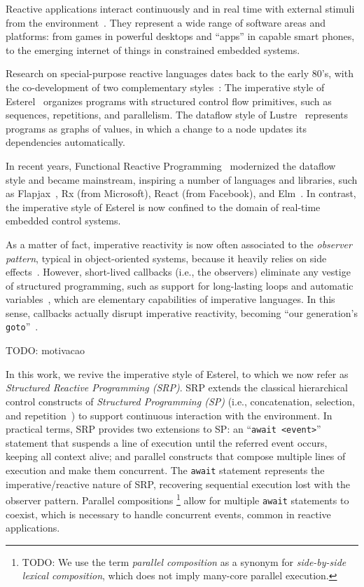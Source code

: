 \documentclass{acm_proc_article-sp}
\newcommand{\code}[1] {{\small{\texttt{#1}}}}
\newcommand{\1}{\;}
\newcommand{\2}{\;\;}
\newcommand{\3}{\;\;\;}
\newcommand{\5}{\;\;\;\;\;}
\begin{document}
Reactive applications interact continuously and in real time with external 
stimuli from the environment~\cite{statecharts.reactive,rp.synchronous}.
They represent a wide range of software areas and platforms: from games in 
powerful desktops and ``apps'' in capable smart phones, to the emerging 
internet of things in constrained embedded systems.

Research on special-purpose reactive languages dates back to the early 80's, 
with the co-development of two complementary 
styles~\cite{rp.twelve,rp.hypothesis}:
%
The imperative style of Esterel~\cite{esterel.ieee91} organizes programs with 
structured control flow primitives, such as sequences, repetitions, and 
parallelism.
%
The dataflow style of Lustre~\cite{lustre.ieee91} represents programs as graphs 
of values, in which a change to a node updates its dependencies automatically.

In recent years, Functional Reactive Programming~\cite{frp.principles} 
modernized the dataflow style and became mainstream, inspiring a number of 
languages and libraries, such as Flapjax~\cite{frp.flapjax}, Rx (from 
Microsoft), React (from Facebook), and Elm~\cite{frp.elm}.
%
In contrast, the imperative style of Esterel is now confined to the domain of 
real-time embedded control systems.

As a matter of fact, imperative reactivity is now often associated to the 
\emph{observer pattern}, typical in object-oriented systems, because it heavily 
relies on side effects~\cite{rp.deprecating,rp.rescala}.
%
However, short-lived callbacks (i.e., the observers) eliminate any vestige of 
structured programming, such as support for long-lasting loops and automatic 
variables~\cite{sync_async.cooperative}, which are elementary capabilities of 
imperative languages.
%
In this sense, callbacks actually disrupt imperative reactivity, becoming ``our 
generation's \code{goto}''~\cite{rp.goto,elm.goto}.

TODO: motivacao

In this work, we revive the imperative style of Esterel, to which we now refer 
as \emph{Structured Reactive Programming (SRP)}.
%
SRP extends the classical hierarchical control constructs of \emph{Structured 
Programming (SP)} (i.e., concatenation, selection, and 
repetition~\cite{dij.notes}) to support continuous interaction with the 
environment.
%
In practical terms, SRP provides two extensions to SP:
an ``\code{await <event>}'' statement that suspends a line of execution until 
the referred event occurs, keeping all context alive;
and parallel constructs that compose multiple lines of execution and make them 
concurrent.
%
The \code{await} statement represents the imperative/reactive nature of SRP, 
recovering sequential execution lost with the observer pattern.
Parallel compositions%
\footnote{
TODO:
We use the term \emph{parallel composition} as a synonym for \emph{side-by-side 
lexical composition}, which does not imply many-core parallel execution.
}
allow for multiple \code{await} statements to coexist, which is necessary to 
handle concurrent events, common in reactive applications.
\end{document}
